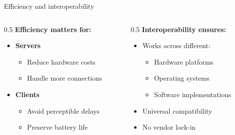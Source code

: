 \documentclass[aspectratio=169, lualatex, handout]{beamer}
\begin{document}
\begin{frame}{Efficiency and interoperability}
	\begin{columns}[c]
		\begin{column}{0.5\textwidth}
			\textbf{Efficiency matters for:}
			\begin{itemize}[<+->]
				\item \textbf{Servers}
				      \begin{itemize}
					      \item Reduce hardware costs
					      \item Handle more connections
				      \end{itemize}
				\item \textbf{Clients}
				      \begin{itemize}
					      \item Avoid perceptible delays
					      \item Preserve battery life
				      \end{itemize}
			\end{itemize}
		\end{column}
		\begin{column}{0.5\textwidth}
			\textbf{Interoperability ensures:}
			\begin{itemize}[<+->]
				\item Works across different:
				      \begin{itemize}
					      \item Hardware platforms
					      \item Operating systems
					      \item Software implementations
				      \end{itemize}
				\item Universal compatibility
				\item No vendor lock-in
			\end{itemize}
		\end{column}
	\end{columns}
\end{frame}
\end{document}
